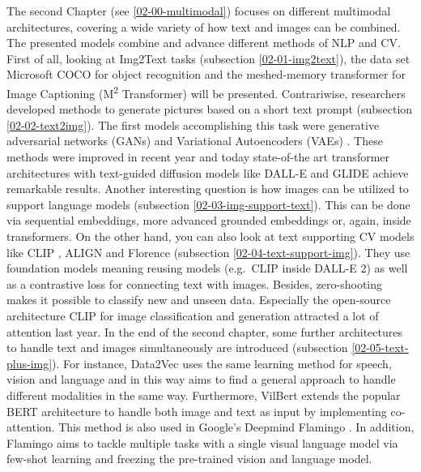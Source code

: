 \documentclass[
]{krantz}
\begin{document}
The second Chapter (see \ref{02-00-multimodal}) focuses on different multimodal architectures, covering a wide variety of how text and images can be combined. The presented models combine and advance different methods of NLP and CV. First of all, looking at Img2Text tasks (subsection \ref{02-01-img2text}), the data set Microsoft COCO for object recognition \citep{COCO} and the meshed-memory transformer for Image Captioning (M\textsuperscript{2} Transformer) \citep{meshed_memory} will be presented. Contrariwise, researchers developed methods to generate pictures based on a short text prompt (subsection \ref{02-02-text2img}). The first models accomplishing this task were generative adversarial networks (GANs) \citep{GAN} and Variational Autoencoders (VAEs) \citep{VAE}. These methods were improved in recent year and today state-of-the art transformer architectures with text-guided diffusion models like DALL-E \citep{DALLE} and GLIDE \citep{GLIDE} achieve remarkable results. Another interesting question is how images can be utilized to support language models (subsection \ref{02-03-img-support-text}). This can be done via sequential embeddings, more advanced grounded embeddings or, again, inside transformers. On the other hand, you can also look at text supporting CV models like CLIP \citep{CLIP}, ALIGN \citep{ALIGN} and Florence \citep{yuan2021florence} (subsection \ref{02-04-text-support-img}). They use foundation models meaning reusing models (e.g.~CLIP inside DALL-E 2) as well as a contrastive loss for connecting text with images. Besides, zero-shooting makes it possible to classify new and unseen data. Especially the open-source architecture CLIP \citep{CLIP} for image classification and generation attracted a lot of attention last year. In the end of the second chapter, some further architectures to handle text and images simultaneously are introduced (subsection \ref{02-05-text-plus-img}). For instance, Data2Vec uses the same learning method for speech, vision and language and in this way aims to find a general approach to handle different modalities in the same way. Furthermore, VilBert \citep{VilBert} extends the popular BERT architecture to handle both image and text as input by implementing co-attention. This method is also used in Google's Deepmind Flamingo \citep{Flamingo}. In addition, Flamingo aims to tackle multiple tasks with a single visual language model via few-shot learning and freezing the pre-trained vision and language model.
\end{document}
